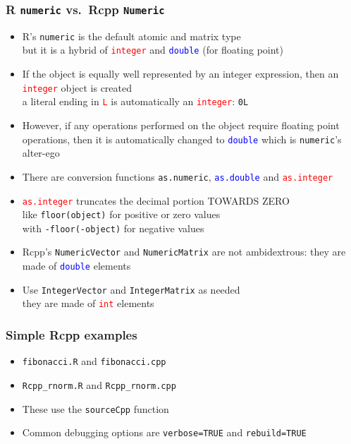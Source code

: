 \documentclass[11pt,pdftex,dvipsnames,usenames,helvetica]{beamer}
\begin{document}
\begin{frame}[fragile]
\frametitle{R {\tt numeric} vs.\ Rcpp {\tt Numeric}}
\begin{itemize}
\item R's {\tt numeric} is the default atomic and matrix type\\
  but it is a hybrid of \textcolor{red}{\tt integer} and
  \textcolor{blue}{\tt double} (for floating point)
\item If the object is equally well represented by an integer
  expression, then an \textcolor{red}{\tt integer} object is created\\
a literal ending in \textcolor{red}{\tt L} is automatically
an \textcolor{red}{\tt integer}: {\tt 0L}
\item However, if any operations performed on the object require
  floating point operations, then it is automatically changed to
  \textcolor{blue}{\tt double} which is {\tt numeric}'s alter-ego
\item There are conversion functions {\tt as.numeric}, 
\textcolor{blue}{\tt as.double} and \textcolor{red}{\tt as.integer}
\item \textcolor{red}{\tt as.integer} truncates the decimal portion
  TOWARDS ZERO\\
like {\tt floor(object)} for positive or zero values\\
with {\tt -floor(-object)} for negative values
\item Rcpp's {\tt NumericVector} and {\tt NumericMatrix}
are not ambidextrous: they are made of \textcolor{blue}{\tt double} elements
\item Use {\tt IntegerVector} and {\tt IntegerMatrix} as needed\\
they are made of \textcolor{red}{\tt int} elements
\end{itemize}

\end{frame}

\begin{frame}[fragile]
\frametitle{Simple Rcpp examples}
\begin{itemize}
\item {\tt fibonacci.R} and {\tt fibonacci.cpp}
\item {\tt Rcpp\_rnorm.R} and {\tt Rcpp\_rnorm.cpp}
\item These use the {\tt sourceCpp} function
\item Common debugging options are {\tt verbose=TRUE}
and {\tt rebuild=TRUE}
\end{itemize}
\end{frame}
\end{document}
